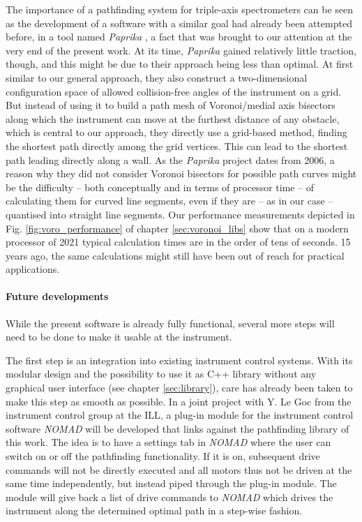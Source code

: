 The importance of a pathfinding system for triple-axis spectrometers can be seen as the development
of a software with a similar goal had already been attempted before, in a tool named 
\textit{Paprika} \cite{Muehlbauer2006}, a fact that was brought to our attention at the very end of the present work.
At its time, \textit{Paprika} gained relatively little traction, though, and this might be due to their approach 
being less than optimal.
At first similar to our general approach, they also construct a two-dimensional configuration space of allowed collision-free 
angles of the instrument on a grid. But instead of using it to build a path mesh of Voronoi/medial axis 
bisectors along which the instrument can move at the furthest distance of any obstacle, which is central 
to our approach, they directly use a grid-based method, finding the shortest path directly among the grid vertices.
This can lead to the shortest path leading directly along a wall.
As the \textit{Paprika} project dates from 2006, a reason why they did not consider Voronoi bisectors 
for possible path curves might be the difficulty -- both conceptually and in terms of processor time -- 
of calculating them for curved line segments, even if they are -- as in our case -- quantised into straight 
line segments.
Our performance measurements depicted in Fig. \ref{fig:voro_performance} of chapter \ref{sec:voronoi_libs}
show that on a modern processor of 2021 typical calculation times are in the order of tens of seconds.
15 years ago, the same calculations might still have been out of reach for practical applications.


\paragraph{Future developments}
While the present software is already fully functional, several more steps will need to be done 
to make it usable at the instrument.

The first step is an integration into existing instrument control systems. 
With its modular design and the possibility to use it as C++ library without any graphical user interface
(see chapter \ref{sec:library}), care has already been taken to make this step as smooth as possible.
In a joint project with Y. Le Goc from the instrument control group at the ILL, a plug-in module for
the instrument control software \textit{NOMAD} \cite{web_NOMAD} will be developed that links against 
the pathfinding library of this work.
The idea is to have a settings tab in \textit{NOMAD} where the user can switch on or off the pathfinding
functionality. If it is on, subsequent drive commands will not be directly executed and all motors thus
not be driven at the same time independently, but instead piped through the plug-in module. 
The module will give back a list of drive commands to \textit{NOMAD} which drives the instrument
along the determined optimal path in a step-wise fashion.


